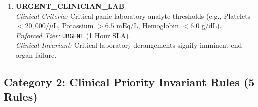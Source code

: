 \documentclass[11pt,a4paper,oneside]{report}
\begin{document}
\begin{enumerate}[leftmargin=20pt]
  \item \textbf{URGENT\_CLINICIAN\_LAB}\\
  \textit{Clinical Criteria:} Critical panic laboratory analyte thresholds (e.g., Platelets $< 20,000/\mu\text{L}$, Potassium $> 6.5\text{ mEq/L}$, Hemoglobin $< 6.0\text{ g/dL}$).\\
  \textit{Enforced Tier:} \texttt{URGENT} (1 Hour SLA).\\
  \textit{Clinical Invariant:} Critical laboratory derangements signify imminent end-organ failure.
\end{enumerate}

\subsection{Category 2: Clinical Priority Invariant Rules (5 Rules)}
\end{document}
